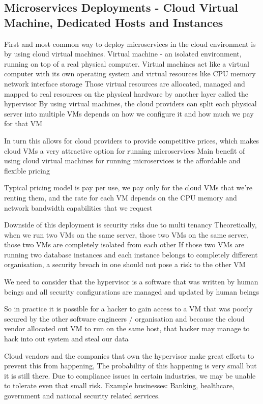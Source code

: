 \subsection{Microservices Deployments - Cloud Virtual Machine, Dedicated Hosts and Instances}
First and most common way to deploy microservices in the cloud environment is by using cloud virtual machines.
Virtual machine - an isolated environment, running on top of a real physical computer.
Virtual machines act like a virtual computer with its own operating system and virtual resources like CPU memory network interface storage
Those virtual resources are allocated, managed and mapped to real resources on the physical hardware by another layer called the hypervisor
By using virtual machines, the cloud providers can split each physical server into multiple VMs depends on how we configure it and how much we pay for that VM

In turn this allows for cloud providers to provide competitive prices, which makes cloud VMs a very attractive option for running microservices
Main benefit of using cloud virtual machines for running microservices is the affordable and flexible pricing

Typical pricing model is pay per use, we pay only for the cloud VMs that we're renting them, and the rate for each VM depends on the CPU memory and network bandwidth capabilities that we request

Downside of this deployment is security risks due to multi tenancy
Theoretically, when we run two VMs on the same server, those two VMs on the same server, those two VMs are completely isolated from each other
If those two VMs are running two database instances and each instance belongs to completely different organisation, a security breach in one should not pose a risk to the other VM

We need to consider that the hypervisor is a software that was written by human beings and all security configurations are managed and updated by human beings

So in practice it is possible for a hacker to gain access to a VM that was poorly secured by the other software engineers / organisation and because the cloud vendor allocated out VM to run on the same host, that hacker may manage to hack into out system and steal our data

Cloud vendors and the companies that own the hypervisor make great efforts to prevent this from happening,
The probability of this happening is very small but it is still there.
Due to compliance issues in certain industries, we may be unable to tolerate even that small risk.
Example businesses: Banking, healthcare, government and national security related services.

